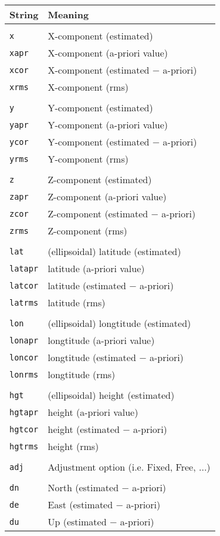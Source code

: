 \begin{tabular}{l l}\label{tab:format_str}
String & Meaning \\
\hline\\
\texttt{x}   & X-component (estimated)\\
\texttt{xapr}& X-component (a-priori value)\\
\texttt{xcor}& X-component (estimated $-$ a-priori)\\
\texttt{xrms}& X-component (rms)\\
\hline\\
\texttt{y}   & Y-component (estimated)\\
\texttt{yapr}& Y-component (a-priori value)\\
\texttt{ycor}& Y-component (estimated $-$ a-priori)\\
\texttt{yrms}& Y-component (rms)\\
\hline\\
\texttt{z}   & Z-component (estimated)\\
\texttt{zapr}& Z-component (a-priori value)\\
\texttt{zcor}& Z-component (estimated $-$ a-priori)\\
\texttt{zrms}& Z-component (rms)\\
\hline\\
\texttt{lat}   & (ellipsoidal) latitude (estimated)\\
\texttt{latapr}& latitude (a-priori value)\\
\texttt{latcor}& latitude (estimated $-$ a-priori)\\
\texttt{latrms}& latitude (rms)\\
\hline\\
\texttt{lon}   & (ellipsoidal) longtitude (estimated)\\
\texttt{lonapr}& longtitude (a-priori value)\\
\texttt{loncor}& longtitude (estimated $-$ a-priori)\\
\texttt{lonrms}& longtitude (rms)\\
\hline\\
\texttt{hgt}   & (ellipsoidal) height (estimated)\\
\texttt{hgtapr}& height (a-priori value)\\
\texttt{hgtcor}& height (estimated $-$ a-priori)\\
\texttt{hgtrms}& height (rms)\\
\hline\\
\texttt{adj}   & Adjustment option (i.e. Fixed, Free, ...)\\
\hline\\
\texttt{dn}    & North (estimated $-$ a-priori)\\
\texttt{de}    & East (estimated $-$ a-priori)\\
\texttt{du}    & Up (estimated $-$ a-priori)\\
\hline
\end{tabular}